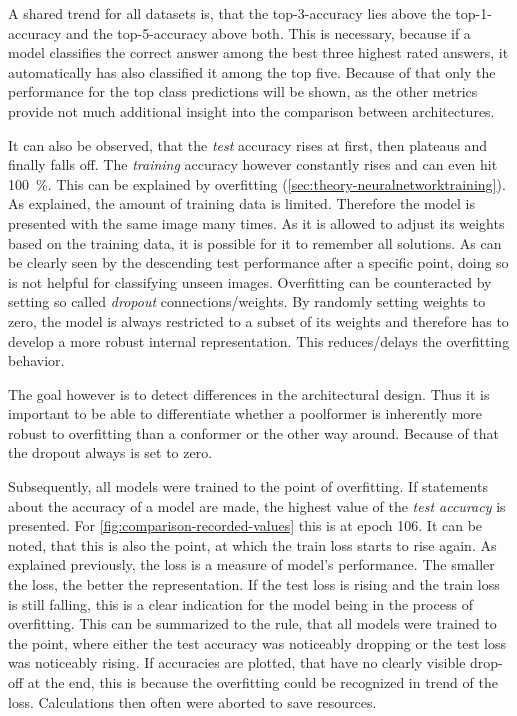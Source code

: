 A shared trend for all datasets is, that the top-3-accuracy lies above the top-1-accuracy and the top-5-accuracy above both. 
This is necessary, because if a model classifies the correct answer among the best three highest rated answers, it automatically has also classified it among the top five. 
Because of that only the performance for the top class predictions will be shown, as the other metrics provide not much  additional insight into the comparison between architectures.

It can also be observed, that the \emph{test} accuracy rises at first, then plateaus and finally falls off.
The \emph{training} accuracy however constantly rises and can even hit \SI[]{100}[]{\percent}.
This can be explained by overfitting (\autoref{sec:theory-neuralnetworktraining}).
As explained, the amount of training data is limited. 
Therefore the model is presented with the same image many times. 
As it is allowed to adjust its weights based on the training data, it is possible for it to \glqq remember\grqq{} all solutions.
As can be clearly seen by the descending test performance after a specific point, doing so is not helpful for classifying unseen images.
Overfitting can be counteracted by setting so called \emph{dropout} connections/weights.
By randomly setting weights to zero, the model is always restricted to a subset of its weights and therefore has to develop a more robust internal representation. This reduces/delays the overfitting behavior.

The goal however is to detect differences in the architectural design. 
Thus it is important to be able to differentiate whether a poolformer is inherently more robust to overfitting than a conformer or the other way around. Because of that the dropout always is set to zero.

Subsequently, all models were trained to the point of overfitting. 
If statements about the accuracy of a model are made, the highest value of the \emph{test accuracy} is presented.
For \autoref{fig:comparison-recorded-values} this is at epoch 106.
It can be noted, that this is also the point, at which the train loss starts to rise again.
As explained previously, the loss is a measure of model's performance. 
The smaller the loss, the better the representation. 
If the test loss is rising and the train loss is still falling, this is a clear indication for the model being in the process of overfitting. 
This can be summarized to the rule, that all models were trained to the point, where either the test accuracy was noticeably dropping or the test loss was noticeably rising.
If accuracies are plotted, that have no clearly visible drop-off at the end, this is because the overfitting could be recognized in trend of the loss. 
Calculations then often were aborted to save resources.

